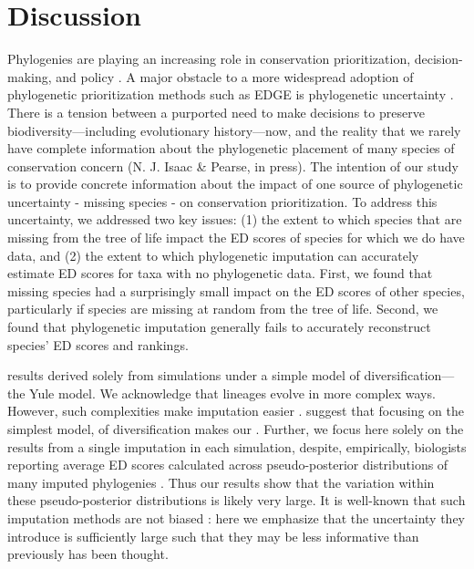 \documentclass[10pt,english]{article}
\begin{document}
\section*{Discussion}
Phylogenies are playing an increasing role in conservation prioritization,
decision-making, and policy \autocite{Vezquez1998, Veron2017}. A major obstacle
to a more widespread adoption of phylogenetic prioritization methods such as
EDGE is phylogenetic uncertainty \autocite{Collen2015}. There is a tension
between a purported need to make decisions to preserve biodiversity---including
evolutionary history---now, and the reality that we rarely have complete
information about the phylogenetic placement of many species of conservation
concern (N. J. Isaac \& Pearse, in press). The intention of our study is to
provide concrete information about the impact of one source of phylogenetic
uncertainty - missing species - on conservation prioritization. To address this
uncertainty, we addressed two key issues: (1) the extent to which species that
are missing from the tree of life impact the ED scores of species for which we
do have data, and (2) the extent to which phylogenetic imputation can accurately
estimate ED scores for taxa with no phylogenetic data. First, we found that
missing species had a surprisingly small impact on the ED scores of other
species, particularly if species are missing at random from the tree of life.
Second, we found that phylogenetic imputation generally fails to accurately
reconstruct species' ED scores and rankings.

  results  derived solely from simulations
under a simple model of diversification---the Yule model. We acknowledge that
lineages evolve in more complex ways. However,  such
complexities  make imputation easier
.  suggest that focusing on
 the simplest model, of diversification
makes our . Further, we focus here solely on the
results from a single imputation in each simulation, despite, empirically,
biologists reporting average ED scores calculated across pseudo-posterior
distributions of many imputed phylogenies \autocite{Kuhn2011}. Thus our results
show that the variation within these pseudo-posterior distributions is likely
very large. It is well-known that such imputation methods are not biased
\autocite[indeed, this was originally shown by][]{Kuhn2011}: here we emphasize
that the uncertainty they introduce is sufficiently large such that they may be
less informative than previously has been thought.
\end{document}
